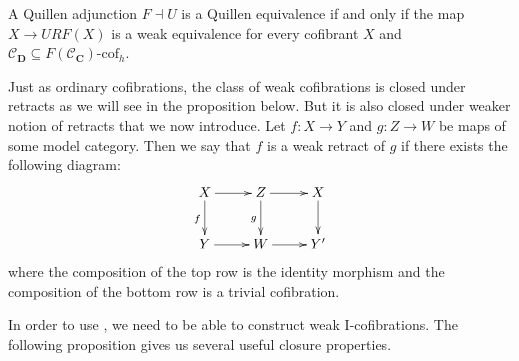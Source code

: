 \documentclass{tac}
\theoremstyle{definition}
\newcommand{\cof}{\mathcal{C}}
\newcommand{\cat}[1]{\mathbf{#1}}
\newcommand{\C}{\cat{C}}
\newcommand{\D}{\cat{D}}
\newcommand{\I}{\mathrm{I}}
\newcommand{\class}[2]{#1\text{-}\mathrm{#2}}
\newcommand{\Icof}[1][\I]{\class{#1}{cof}}
\begin{document}
\begin{cor}
A Quillen adjunction $F \dashv U$ is a Quillen equivalence if and only if the map $X \to URF(X)$ is a weak equivalence for every cofibrant $X$ and $\cof_\D \subseteq \Icof[F(\cof_\C)]_h$.
\end{cor}

Just as ordinary cofibrations, the class of weak cofibrations is closed under retracts as we will see in the proposition below.
But it is also closed under weaker notion of retracts that we now introduce.
Let $f : X \to Y$ and $g : Z \to W$ be maps of some model category.
Then we say that $f$ is a weak retract of $g$ if there exists the following diagram:
\[ \xymatrix{ X \ar[r] \ar[d]_f & Z \ar[r] \ar[d]_g & X \ar[d] \\
              Y \ar[r]          & W \ar[r]          & Y'
            } \]
where the composition of the top row is the identity morphism and the composition of the bottom row is a trivial cofibration.

In order to use , we need to be able to construct weak $\I$-cofibrations.
The following proposition gives us several useful closure properties.
\end{document}

